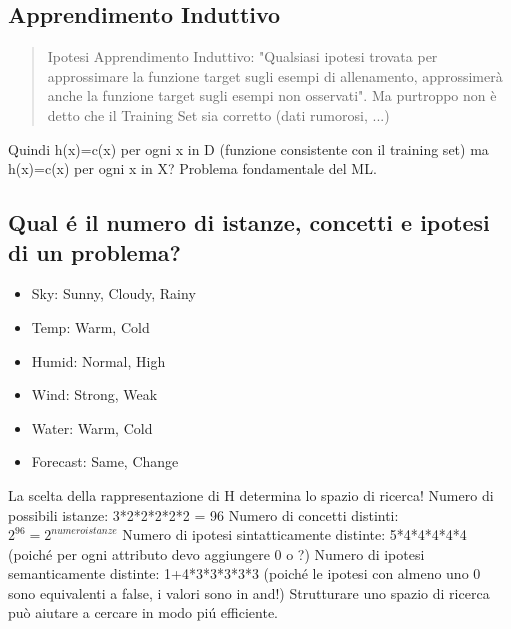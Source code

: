 \documentclass{article}
\begin{document}
\subsection{Apprendimento Induttivo}
\begin{quote}
    Ipotesi Apprendimento Induttivo: "Qualsiasi ipotesi trovata per approssimare la funzione target sugli esempi di allenamento, approssimerà anche la funzione target sugli esempi non osservati". Ma purtroppo non è detto che il Training Set sia corretto (dati rumorosi, ...)
\end{quote}
Quindi h(x)=c(x) per ogni x in D (funzione consistente con il training set) ma h(x)=c(x) per ogni x in X? Problema fondamentale del ML.

\subsection{Qual é il numero di istanze, concetti e ipotesi di un problema?}
\begin{itemize}
    \item Sky: Sunny, Cloudy, Rainy
    \item Temp: Warm, Cold
    \item Humid: Normal, High
    \item Wind: Strong, Weak
    \item Water: Warm, Cold
    \item Forecast: Same, Change
\end{itemize}
La scelta della rappresentazione di H determina lo spazio di ricerca! \newline
Numero di possibili istanze: 3*2*2*2*2*2 = 96 \newline
Numero di concetti distinti: $2^{96} = 2^{numeroistanze}$ \newline
Numero di ipotesi sintatticamente distinte: 5*4*4*4*4*4 (poiché per ogni attributo devo aggiungere 0 o ?) \newline
Numero di ipotesi semanticamente distinte: 1+4*3*3*3*3*3 (poiché le ipotesi con almeno uno 0 sono equivalenti a false, i valori sono in and!) \newline
Strutturare uno spazio di ricerca può aiutare a cercare in modo piú efficiente.
\end{document}
